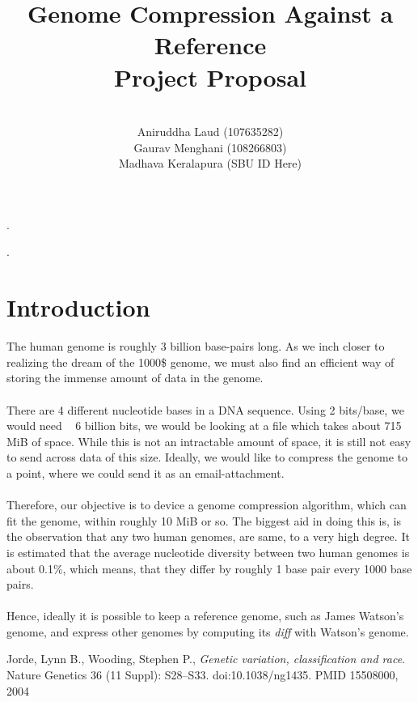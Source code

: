 \documentclass{article}
\title{Genome Compression Against a Reference \\
        Project Proposal \\}
\author{\\
        Aniruddha Laud (107635282)\\
        Gaurav Menghani (108266803)\\
        Madhava Keralapura (SBU ID Here)\\}
\begin{document}
\maketitle

\clearpage
.
\clearpage

\tableofcontents

\clearpage
.
\clearpage

\section {Introduction}
The human genome is roughly 3 billion base-pairs long. As we inch closer to realizing the dream of the 1000\$ genome, we must also find an efficient way of storing the immense amount of data in the genome.\\
\\
There are 4 different nucleotide bases in a DNA sequence. Using 2 bits/base, we would need ~ 6 billion bits, we would be looking at a file which takes about 715 MiB of space. While this is not an intractable amount of space, it is still not easy to send across data of this size. Ideally, we would like to compress the genome to a point, where we could send it as an email-attachment.\\
\\
Therefore, our objective is to device a genome compression algorithm, which can fit the genome, within roughly 10 MiB or so. The biggest aid in doing this is, is the observation that any two human genomes, are same, to a very high degree. It is estimated that the average nucleotide diversity between two human genomes is about 0.1\%, which means, that they differ by roughly 1 base pair every 1000 base pairs.\cite{jorde04}\\
\\
Hence, ideally it is possible to keep a reference genome, such as James Watson's genome, and express other genomes by computing its \emph{diff} with Watson's genome. 

\clearpage

\begin{thebibliography}{9}

  Jorde, Lynn B., Wooding, Stephen P.,
  \emph{Genetic variation, classification and race}.
  Nature Genetics 36 (11 Suppl): S28–S33. doi:10.1038/ng1435. PMID 15508000,
  2004

\end{thebibliography}
\end{document}
